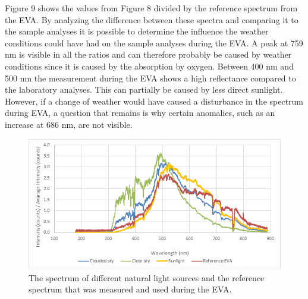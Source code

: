 \documentclass[preprint]{elsarticle}
\begin{document}
Figure 9 shows the values from Figure 8 divided by the reference spectrum from the EVA. By analyzing the difference between these spectra and comparing it to the sample analyses it is possible to determine the influence the weather conditions could have had on the sample analyses during the EVA. A peak at 759 nm is visible in all the ratios and can therefore probably be caused by weather conditions since it is caused by the absorption by oxygen. Between 400 nm and 500 nm the measurement during the EVA shows a high reflectance compared to the laboratory analyses. This can partially be caused by less direct sunlight. However, if a change of weather would have caused a disturbance in the spectrum during EVA, a question that remains is why certain anomalies, such as an increase at 686 nm, are not visible.

\begin{figure}
\centering
\includegraphics{img/figure08.png}
\caption{The spectrum of different natural light sources and the reference spectrum that was measured and used during the EVA.}
\end{figure}
\end{document}
